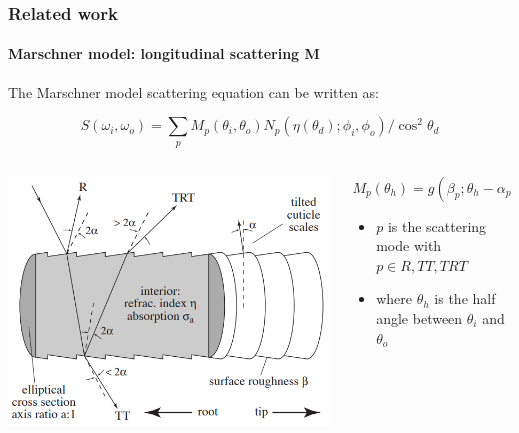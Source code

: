 \documentclass{beamer}
\begin{document}
  \begin{frame}
  \frametitle{Related work}
  \framesubtitle{Marschner model: longitudinal scattering M}
  The Marschner model scattering equation can be written as:
  
  \begin{equation}
  S(\omega_i, \omega_o) = \sum_p M_p(\theta_i, \theta_o) N_p(\eta(\theta_d); \phi_i, \phi_o) / \cos^2 \theta_d
  \end{equation}
  
  \begin{columns}[onlytextwidth]
    \begin{column}{.5\textwidth}
    	\includegraphics[width=\textwidth,center]{../thesis/images/marschner_model_longitudinal.png}
    \end{column}
    \begin{column}{.5\textwidth}
    \centering
    \begin{equation}
  M_p(\theta_h) = g(\beta_p; \theta_h-\alpha_p)
  \end{equation}  
  \begin{itemize}
  \item $p$ is the scattering mode with $p \in {R, TT, TRT}$
  \item where $\theta_h$ is the half angle between $\theta_i$ and $\theta_o$
  \end{itemize}
    \end{column}
    \end{columns}
   
  
  
  \end{frame}
  
\end{document}
